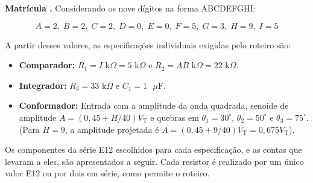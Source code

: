 \documentclass[11pt,a4paper]{article}
\begin{document}
\begin{espec}

\textbf{Matrícula .} Considerando os nove dígitos na forma ABCDEFGHI:

\begin{equation}
    A=2,\; B=2,\; C=2,\; D=0,\; E=0,\; F=5,\; G=3,\; H=9,\; I=5
\end{equation}

A partir desses valores, as especificações individuais exigidas pelo roteiro são:

\begin{itemize}
    \item \textbf{Comparador:} \hfill\break
    $R_1 = I\text{ k}\Omega = 5\text{ k}\Omega$ e $R_2 = AB\text{ k}\Omega = 22\text{ k}\Omega$.

\vspace{0.3cm}

    \item \textbf{Integrador:} \hfill\break
    $R_3 = 33\text{ k}\Omega$ e $C_1 = 1\text{ }\mu\text{F}$.

    \vspace{0.3cm}

    \item \textbf{Conformador:} \hfill\break
    Entrada com a amplitude da onda quadrada, senoide de amplitude $A = (0{,}45 + H/40) V_{\text{T}}$ e quebras em $\theta_{1} = 30^\circ$, $\theta_2 = 50^\circ$ e $\theta_3 = 75^\circ$. (Para $H=9$, a amplitude projetada é $A = (0{,}45 + 9/40) V_{\text{T}} = 0{,}675 V_{\text{T}}$).
\end{itemize}

\end{espec}

\label{sec:projeto_lurian}Os componentes da série E12 escolhidos para cada especificação, e as contas que levaram a eles, são apresentados a seguir. Cada resistor é realizado por um único valor E12 ou por dois em série, como permite o roteiro.
\end{document}
